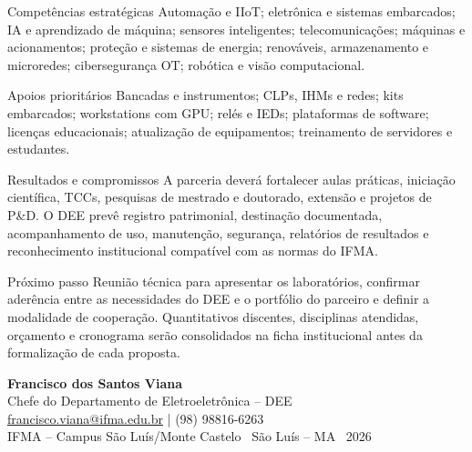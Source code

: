 \documentclass[11pt,a4paper]{article}
\begin{document}
\begin{tcbraster}[raster columns=2, raster equal height=rows,
                  raster column skip=2.5mm, raster left skip=0pt, raster right skip=0pt]
\begin{resumobox}{Competências estratégicas}
\small Automação e IIoT; eletrônica e sistemas embarcados; IA e aprendizado de máquina; sensores inteligentes; telecomunicações; máquinas e acionamentos; proteção e sistemas de energia; renováveis, armazenamento e microredes; cibersegurança OT; robótica e visão computacional.
\end{resumobox}
\begin{resumobox}{Apoios prioritários}
\small Bancadas e instrumentos; CLPs, IHMs e redes; kits embarcados; workstations com GPU; relés e IEDs; plataformas de software; licenças educacionais; atualização de equipamentos; treinamento de servidores e estudantes.
\end{resumobox}
\end{tcbraster}

\begin{resumobox}{Resultados e compromissos}
\small A parceria deverá fortalecer aulas práticas, iniciação científica, TCCs, pesquisas de mestrado e doutorado, extensão e projetos de P\&D. O DEE prevê registro patrimonial, destinação documentada, acompanhamento de uso, manutenção, segurança, relatórios de resultados e reconhecimento institucional compatível com as normas do IFMA.
\end{resumobox}

\begin{resumobox}{Próximo passo}
\small Reunião técnica para apresentar os laboratórios, confirmar aderência entre as necessidades do DEE e o portfólio do parceiro e definir a modalidade de cooperação. Quantitativos discentes, disciplinas atendidas, orçamento e cronograma serão consolidados na ficha institucional antes da formalização de cada proposta.
\end{resumobox}

\vspace{2mm}
\begin{center}
{\sffamily\bfseries\color{azulpetroleo} Francisco dos Santos Viana}\\[-0.2mm]
{\small Chefe do Departamento de Eletroeletrônica -- DEE}\\[-0.2mm]
{\small\href{mailto:francisco.viana@ifma.edu.br}{francisco.viana@ifma.edu.br} \quad | \quad (98) 98816-6263}\\[1mm]
{\footnotesize\color{cinzamedio} IFMA -- Campus São Luís/Monte Castelo \textbullet\ São Luís -- MA \textbullet\ 2026}
\end{center}
\end{document}
